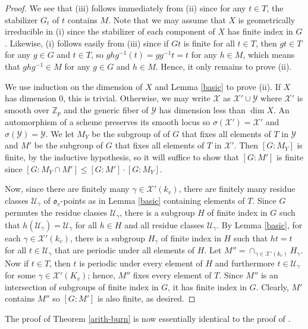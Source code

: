\documentclass{amsart}
\newcommand{\bZ} {\mathbb{Z}}
\newcommand{\cU}{\mathcal{U}}
\newcommand{\fo}{\mathfrak o}
\newcommand{\cX}{\mathcal X}
\newcommand{\cY}{\mathcal Y}
\theoremstyle{definition}
\begin{document}
\begin{proof}
  We see that (iii) follows immediately from (ii) since for any
  $t \in T$, the stabilizer $G_t$ of $t$ contains $M$.  Note that we
  may assume that $X$ is geometrically irreducible in (i) since the
  stabilizer of each component of $X$ has finite index in $G$.
  Likewise, (i) follows easily from (iii) since  if $Gt$ is finite
  for all $t \in T$, then $gt \in T$ for any $g
  \in G$ and $t \in T$, so $ghg^{-1}(t) = g g^{-1} t = t$ for
  any $h \in M$, which means that $g h g^{-1} \in M$ for any $g \in G$
  and $h \in M$.   Hence, it only remains to prove (ii).  
  
We use induction on the dimension of $X$ and Lemma \ref{basic} to prove
(ii).  If $X$
has dimension 0, this is trivial.  Otherwise, we may write $\cX$ as
$\cX' \cup \cY$ where $\cX'$ is smooth over $\bZ_p$ and the generic
fiber of $\cY$ has dimension less than $\dim X$.  An automorphism of a
scheme preserves its smooth locus so $\sigma(\cX') = \cX'$ and
$\sigma(\cY) = \cY$.  We let $M_Y$ be the subgroup of of $G$ that
fixes all elements of $T$ in $\cY$ and $M'$ be the subgroup of $G$
that fixes all elements of $T$ in $\cX'$.  Then $[G:M_Y]$ is finite,
by the inductive hypothesis, so it will suffice to show that $[G:M']$
is finite
since $[G:M_Y \cap M'] \leq [G:M'] \cdot [G:M_Y]$.  

Now, since there are finitely many $\gamma \in \cX'(k_v)$, there are
finitely many residue classes $\cU_\gamma$ of $\fo_v$-points as in
Lemma \ref{basic} containing elements of $T$.  Since $G$ permutes the
residue classes $\cU_\gamma$, there is a subgroup $H$ of finite index
in $G$ such that $h(\cU_\gamma) = \cU_\gamma$ for all $h \in H$ and
all residue classes $\cU_\gamma$. By Lemma \ref{basic}, for each
$\gamma \in \cX'(k_v)$, there is a subgroup $H_\gamma$ of finite index
in $H$ such that $ht =t$ for all $t \in \cU_\gamma$ that are periodic
under all elements of $H$.  Let
$M'' = \cap_{\gamma \in \cX'(k_v)} H_\gamma$.  Now if $t \in T$, then
$t$ is periodic under every element of $H$ and furthermore
$t \in \cU_\gamma$ for some $\gamma \in \cX'(K_v)$; hence, $M''$ fixes
every element of $T$.  Since $M''$ is an intersection of subgroups of
finite index in $G$, it has finite index in $G$.  Clearly, $M'$
contains $M''$ so $[G:M']$ is also finite, as desired.
\end{proof}



The proof of Theorem \ref{arith-burn} is now essentially identical to
the proof of \cite[Theorem 1.2]{BGT2}.
\end{document}
